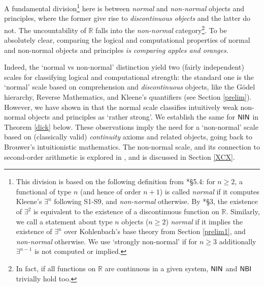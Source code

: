 \documentclass[reqno]{amsart}
\def\R{{\mathbb  R}}
\def\NBI{\textup{\textsf{NBI}}}
\def\NIN{\textup{\textsf{NIN}}}
\numberwithin{equation}{section}
\numberwithin{thm}{section}
\begin{document}
\smallskip  

A fundamental division\footnote{This division is based on the following definition from \cite{longmann}*{\S5.4}: for $n\geq 2$, a functional of type $n$ (and hence of order $n+1$) is called \emph{normal} if it computes Kleene's $\exists^{n}$ following S1-S9, and \emph{non-normal} otherwise.  
By \cite{kohlenbach2}*{\S3}, the existence of $\exists^{2}$ is equivalent to the existence of a discontinuous function on $\R$.
Similarly, we call a statement about type $n$ objects ($n\geq 2$) \emph{normal} if it implies the existence of $\exists^{n}$ over Kohlenbach's base theory from Section \ref{prelim1}, and \emph{non-normal} otherwise.  We use `strongly non-normal' if for $n\geq 3$ additionally $\exists^{n-1}$ is not computed or implied.\label{frakker}} here is between \emph{normal} and \emph{non-normal} objects and principles, where the former give rise to \emph{discontinuous objects} and the latter do not.  
The uncountability of $\R$ falls into the \emph{non-normal} category\footnote{In fact, if all functions on $\R$ are continuous in a given system, $\NIN$ and $\NBI$ trivially hold too.}.  
To be absolutely clear, comparing the logical and computational properties of normal and non-normal objects and principles \emph{is comparing apples and oranges.}

\smallskip

Indeed, the `normal vs non-normal' distinction yield two (fairly independent) scales for classifying logical and computational strength: the standard one is the `normal' scale based on comprehension and \emph{discontinuous} objects, like the G\"odel hierarchy, Reverse Mathematics, and Kleene's quantifiers (see Section \ref{prelim}).  
However, we have shown in \cites{dagsam, dagsamII, dagsamIII, dagsamV, dagsamVI,dagsamVII} that the normal scale classifies intuitively weak non-normal objects and principles as `rather strong'.  
We establish the same for $\NIN$ in Theorem \ref{dick} below.   
These observations imply the need for a `non-normal' scale based on (classically valid) \emph{continuity} axioms and related objects, going back to Brouwer's intuitionistic mathematics. 
The non-normal scale, and its connection to second-order arithmetic is explored in \cite{samph}, and is discussed in Section \ref{XCX}.

\smallskip
\end{document}
